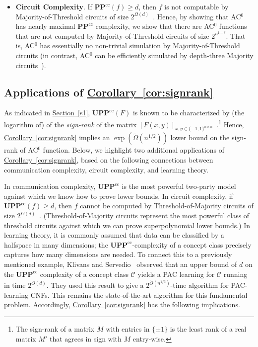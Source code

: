 \documentclass[11pt]{article}
\numberwithin{equation}{section}
\theoremstyle{definition}
\theoremstyle{plain}
\newcommand{\expref}[2]{\hyperref[#2]{#1~\ref{#2}}}
\newcommand{\bits}{\{-1,1\}}
\newcommand{\PPcc}{\mathbf{PP}^{\text{cc}}}
\newcommand{\UPP}{\mathbf{UPP}}
\newcommand{\UPPcc}{\mathbf{UPP}^{\text{cc}}}
\begin{document}
\begin{itemize}
	\vspace{-1mm}
	\item \textbf{Circuit Complexity}.  If $\PPcc(f)\geq d$, then $f$ is not computable by Majority-of-Threshold circuits of size $2^{\Omega(d)}$~\cite{nisan}.
	Hence, by showing that AC$^0$ has nearly maximal $\PPcc$ complexity, we show
	that there are AC$^0$ functions that are not computed by Majority-of-Threshold circuits of size $2^{n^{1-\delta}}$.
	That is, AC$^0$ has essentially no non-trivial simulation by Majority-of-Threshold circuits (in contrast,
AC$^0$ can be efficiently simulated by depth-three Majority circuits~\cite{allender}).
	
	
	
\end{itemize}


\subsection{Applications of \expref{Corollary}{cor:signrank}} 

As indicated in \expref{Section}{s1}, $\UPPcc(F)$ is known to be characterized by (the logarithm of)
of the \emph{sign-rank} of the matrix $[F(x, y)]_{x, y \in \bits^{n \times n}}$~\cite{paturisimon}.\footnote{The sign-rank of a matrix $M$
	with entries in $\{\pm1\}$
	is the least rank of a real matrix $M'$ that agrees in sign with $M$ entry-wise.}
Hence,  \expref{Corollary}{cor:signrank} implies an $\exp(\tilde{\Omega}(n^{1/2}))$ lower bound on the sign-rank of AC$^0$ function.
Below, we highlight two additional applications of  \expref{Corollary}{cor:signrank}, based on the following connections
between communication complexity, circuit complexity, and learning theory. 

In communication complexity, $\UPP^{\text{cc}}$ is the most powerful two-party model against which we know how to prove lower bounds. 
In circuit complexity, if $\UPP^{\text{cc}}(f) \geq d$, then $f$ cannot be computed
by Threshold-of-Majority circuits of size $2^{\Omega(d)}$~\cite{forstertm}. (Threshold-of-Majority circuits represent the most powerful class of threshold circuits against which we can
prove superpolynomial lower bounds.)
In learning theory, it is commonly assumed that data can be classified by a halfspace in many dimensions; the $\UPP^{\text{cc}}$-complexity of a concept class precisely captures how many dimensions are needed.
To connect this to a previously mentioned example, Klivans and Servedio~\cite{ksdnf} observed that an upper bound of $d$ on the $\UPPcc$
complexity of a concept class $\mathcal{C}$ yields a PAC learning for $\mathcal{C}$ running in time $2^{O(d)}$. They 
used this result to give a $2^{\tilde{O}(n^{1/3})}$-time algorithm for PAC-learning CNFs. This remains the state-of-the-art algorithm for this fundamental problem.
Accordingly, \expref{Corollary}{cor:signrank} has the following implications.
\end{document}
